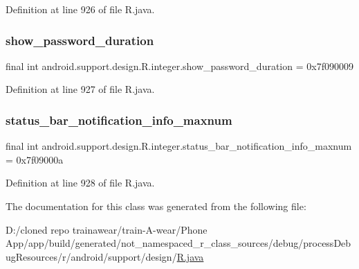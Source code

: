 Definition at line 926 of file R.\+java.

\mbox{\label{classandroid_1_1support_1_1design_1_1_r_1_1integer_a10ce8bfe10cb0e779af49220383e052c}} 
\subsubsection{\texorpdfstring{show\_password\_duration}{show\_password\_duration}}
{\footnotesize\ttfamily final int android.\+support.\+design.\+R.\+integer.\+show\+\_\+password\+\_\+duration = 0x7f090009\hspace{0.3cm}{\ttfamily [static]}}



Definition at line 927 of file R.\+java.

\mbox{\label{classandroid_1_1support_1_1design_1_1_r_1_1integer_a4b128748dfc77dbedbe2c85115af5a64}} 
\subsubsection{\texorpdfstring{status\_bar\_notification\_info\_maxnum}{status\_bar\_notification\_info\_maxnum}}
{\footnotesize\ttfamily final int android.\+support.\+design.\+R.\+integer.\+status\+\_\+bar\+\_\+notification\+\_\+info\+\_\+maxnum = 0x7f09000a\hspace{0.3cm}{\ttfamily [static]}}



Definition at line 928 of file R.\+java.



The documentation for this class was generated from the following file\+:\begin{DoxyCompactItemize}
\item 
D\+:/cloned repo trainawear/train-\/\+A-\/wear/\+Phone App/app/build/generated/not\+\_\+namespaced\+\_\+r\+\_\+class\+\_\+sources/debug/process\+Debug\+Resources/r/android/support/design/\mbox{\hyperlink{process_debug_resources_2r_2android_2support_2design_2_r_8java}{R.\+java}}\end{DoxyCompactItemize}
